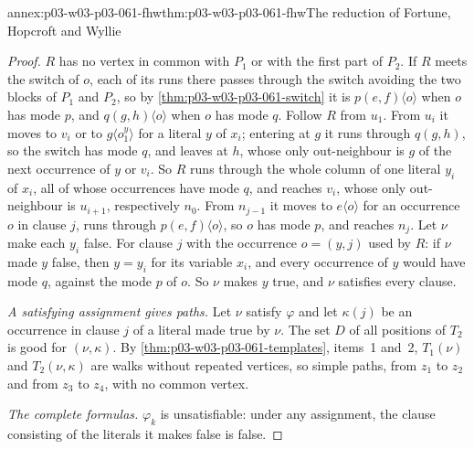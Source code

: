 \begin{annexitem}{annex:p03-w03-p03-061-fhw}{thm:p03-w03-p03-061-fhw}{The reduction of Fortune, Hopcroft and Wyllie}
\begin{proof}
\(R\) has no vertex in common with \(P_1\) or with the first part of
\(P_2\). If \(R\) meets the switch of \(o\), each of its runs there passes
through the switch avoiding the two blocks of \(P_1\) and \(P_2\), so by
\cref{thm:p03-w03-p03-061-switch} it is \(p(e,f)\langle o\rangle\) when \(o\)
has mode \(p\), and \(q(g,h)\langle o\rangle\) when \(o\) has mode \(q\).
Follow \(R\) from \(u_1\). From \(u_i\) it moves to \(v_i\) or to
\(g\langle o^y_1\rangle\) for a literal \(y\) of \(x_i\); entering at
\(g\) it runs through \(q(g,h)\), so the switch has mode \(q\), and leaves at
\(h\), whose only out-neighbour is \(g\) of the next occurrence of \(y\) or
\(v_i\). So \(R\) runs through the whole column of one literal \(y_i\) of
\(x_i\), all of whose occurrences have mode \(q\), and reaches \(v_i\), whose
only out-neighbour is \(u_{i+1}\), respectively \(n_0\). From \(n_{j-1}\) it
moves to \(e\langle o\rangle\) for an occurrence \(o\) in clause \(j\), runs
through \(p(e,f)\langle o\rangle\), so \(o\) has mode \(p\), and reaches
\(n_j\). Let \(\nu\) make each \(y_i\) false. For clause \(j\) with the
occurrence \(o=(y,j)\) used by \(R\): if \(\nu\) made \(y\) false, then
\(y=y_i\) for its variable \(x_i\), and every occurrence of \(y\) would have
mode \(q\), against the mode \(p\) of \(o\). So \(\nu\) makes \(y\) true, and
\(\nu\) satisfies every clause.

\emph{A satisfying assignment gives paths.} Let \(\nu\) satisfy \(\varphi\)
and let \(\kappa(j)\) be an occurrence in clause \(j\) of a literal made true
by \(\nu\). The set \(D\) of all positions of \(T_2\) is good for
\((\nu,\kappa)\). By \cref{thm:p03-w03-p03-061-templates}, items~1 and~2,
\(T_1(\nu)\) and \(T_2(\nu,\kappa)\) are walks without repeated vertices, so
simple paths, from \(z_1\) to \(z_2\) and from \(z_3\) to \(z_4\), with no
common vertex.

\emph{The complete formulas.} \(\varphi_k\) is unsatisfiable: under any
assignment, the clause consisting of the literals it makes false is false.
\end{proof}
\end{annexitem}

